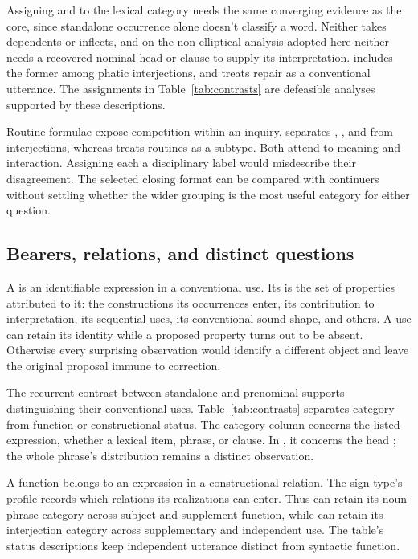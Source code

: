 \documentclass[12pt]{article}
\begin{document}
Assigning  and  to the lexical category
needs the same converging evidence as the core, since standalone occurrence
alone doesn't classify a word. Neither takes dependents or inflects, and on
the non-elliptical analysis adopted here neither needs a recovered nominal
head or clause to supply its interpretation. \textcite[114]{ameka1992}
includes the former among phatic interjections, and
\textcite[152]{wilkins1992} treats repair  as a conventional
utterance. The assignments in Table~\ref{tab:contrasts} are defeasible
analyses supported by these descriptions.

Routine formulae expose competition within an inquiry.
\textcite[108--110]{ameka1992} separates , ,
and  from interjections, whereas
\textcite[142]{wilkins1992} treats routines as a subtype. Both attend
to meaning and interaction. Assigning each a disciplinary label would
misdescribe their disagreement. The selected closing format can be
compared with continuers without settling whether the wider grouping
is the most useful category for either question.

\subsection{Bearers, relations, and distinct questions}

A  is an identifiable expression in a conventional use.
Its  is the set of properties attributed to it: the
constructions its occurrences enter, its contribution to interpretation,
its sequential uses, its conventional sound shape, and others. A use can retain its identity
while a proposed property turns out to be absent. Otherwise every
surprising observation would identify a different object and leave the
original proposal immune to correction.

The recurrent contrast between standalone and prenominal 
supports distinguishing their conventional uses. Table~\ref{tab:contrasts}
separates category from function or constructional status. The category
column concerns the listed expression, whether a lexical item, phrase,
or clause. In , it concerns the head ;
the whole phrase's distribution remains a distinct observation.

A function belongs to an expression in a constructional relation.
The sign-type's profile records which relations its realizations can
enter. Thus  can retain its noun-phrase category
across subject and supplement function, while  can retain
its interjection category across supplementary and independent use.
The table's status descriptions keep independent utterance distinct
from syntactic function.
\end{document}
